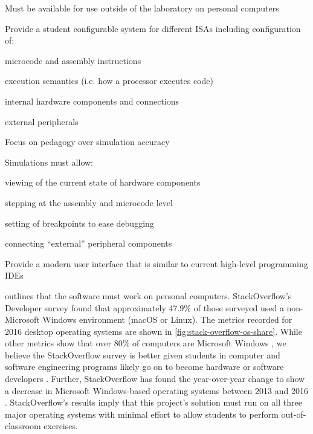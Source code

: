 \begin{requirements}
    \item\label{req:personal} Must be available for use outside of the laboratory on personal computers
        
    \item\label{req:configuration} Provide a student configurable system for different ISAs including configuration of:
        \begin{requirements}
            \item microcode and assembly instructions
            \item execution semantics (i.e. how a processor executes code)
            \item internal hardware components and connections
            \item external peripherals
        \end{requirements}
        
    \item\label{req:pedagogical} Focus on pedagogy over simulation accuracy
       
    \item\label{req:simulations} Simulations must allow: 
        \begin{requirements}
            \item viewing of the current state of hardware components
            \item stepping at the assembly and microcode level
            \item setting of breakpoints to ease debugging
            \item connecting ``external'' peripheral components
        \end{requirements}
    
    \item \label{req:modern} Provide a modern user interface that is similar to current high-level programming IDEs
        
\end{requirements}

 outlines that the software must work on personal computers. StackOverflow's Developer survey \cite{StackOverflowSurvey2016} found that approximately 47.9\% of those surveyed used a non-Microsoft Windows environment (macOS or Linux). The metrics recorded for 2016 desktop operating systems are shown in \cref{fig:stack-overflow-os-share}. While other metrics show that over 80\% of computers are Microsoft Windows \cite{StatCounter2017}, we believe the StackOverflow survey is better given students in computer and software engineering programs likely go on to become hardware or software developers \cite[Sec.~II.~Developer~Profiles]{StackOverflowSurvey2016}. Further, StackOverflow has found the year-over-year change to show a decrease in Microsoft Windows-based operating systems between 2013 and 2016 \cite{StackOverflowSurvey2016}. StackOverflow's results imply that this project's solution must run on all three major operating systems with minimal effort to allow students to perform out-of-classroom exercises. 

